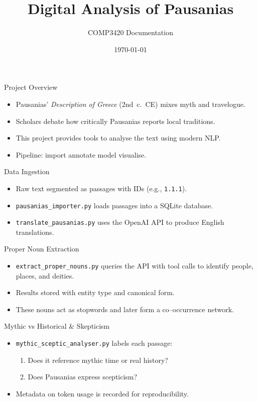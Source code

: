 \documentclass{beamer}
\title{Digital Analysis of Pausanias}
\author{COMP3420 Documentation}
\date{\today}
\begin{document}
\begin{frame}
  \titlepage
\end{frame}

\begin{frame}{Project Overview}
  \begin{itemize}
    \item Pausanias' \emph{Description of Greece} (2nd~c.~CE) mixes myth and travelogue.
    \item Scholars debate how critically Pausanias reports local traditions.
    \item This project provides tools to analyse the text using modern NLP.
    \item Pipeline: import \textrightarrow{} annotate \textrightarrow{} model \textrightarrow{} visualise.
  \end{itemize}
\end{frame}

\begin{frame}{Data Ingestion}
  \begin{itemize}
    \item Raw text segmented as passages with IDs (e.g., \texttt{1.1.1}).
    \item \texttt{pausanias\_importer.py} loads passages into a SQLite database.
    \item \texttt{translate\_pausanias.py} uses the OpenAI API to produce English translations.
  \end{itemize}
\end{frame}

\begin{frame}{Proper Noun Extraction}
  \begin{itemize}
    \item \texttt{extract\_proper\_nouns.py} queries the API with tool calls to identify people, places, and deities.
    \item Results stored with entity type and canonical form.
    \item These nouns act as stopwords and later form a co--occurrence network.
  \end{itemize}
\end{frame}

\begin{frame}{Mythic vs Historical \& Skepticism}
  \begin{itemize}
    \item \texttt{mythic\_sceptic\_analyser.py} labels each passage:
          \begin{enumerate}
            \item Does it reference mythic time or real history?
            \item Does Pausanias express scepticism?
          \end{enumerate}
    \item Metadata on token usage is recorded for reproducibility.
  \end{itemize}
\end{frame}
\end{document}
